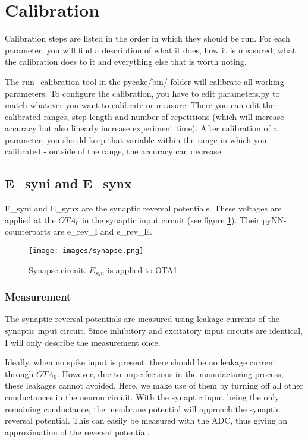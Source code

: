 \documentclass[12pt,a4paper,bibliography=totocnumbered,listof=totocnumbered]{scrartcl}
\begin{document}
\section{Calibration}
Calibration steps are listed in the order in which they should be run. For each parameter, you will find a description of what it does, how it is measured, what the calibration does to it and everything else that is worth noting.

The run\_calibration tool in the pycake/bin/ folder will calibrate all working parameters. To configure the calibration, you have to edit parameters.py to match whatever you want to calibrate or measure. There you can edit the calibrated ranges, step length and number of repetitions (which will increase accuracy but also linearly increase experiment time). After calibration of a parameter, you should keep that variable within the range in which you calibrated - outside of the range, the accuracy can decrease.

\subsection{E\_syni and E\_synx}
E\_syni and E\_synx are the synaptic reversal potentials. These voltages are applied at the $OTA_0$ in the synaptic input circuit (see figure \ref{figure:synapse}). Their pyNN-counterparts are e\_rev\_I and e\_rev\_E.

\begin{figure}[h]
\begin{center}
\texttt{[image: images/synapse.png]}
\caption{Synapse circuit. $E_{syn}$ is applied to OTA1}
\label{figure:synapse}
\end{center}
\end{figure}

\subsubsection*{Measurement}
The synaptic reversal potentials are measured using leakage currents of the synaptic input circuit. Since inhibitory and excitatory input circuits are identical, I will only describe the measurement once.

Ideally, when no spike input is present, there should be no leakage current through $OTA_0$. However, due to imperfections in the manufacturing process, these leakages cannot avoided. Here, we make use of them by turning off all other conductances in the neuron circuit. With the synaptic input being the only remaining conductance, the membrane potential will approach the synaptic reversal potential. This can easily be measured with the ADC, thus giving an approximation of the reversal potential.
\end{document}
